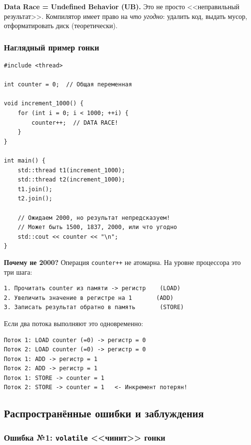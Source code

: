 \documentclass[a4paper,12pt]{article}
\begin{document}
\textbf{Data Race = Undefined Behavior (UB).} Это не просто <<неправильный результат>>.
Компилятор имеет право на \textit{что угодно}: удалить код, выдать мусор,
отформатировать диск (теоретически).

\subsubsection{Наглядный пример гонки}

\begin{lstlisting}
#include <thread>

int counter = 0;  // Общая переменная

void increment_1000() {
    for (int i = 0; i < 1000; ++i) {
        counter++;  // DATA RACE!
    }
}

int main() {
    std::thread t1(increment_1000);
    std::thread t2(increment_1000);
    t1.join();
    t2.join();

    // Ожидаем 2000, но результат непредсказуем!
    // Может быть 1500, 1837, 2000, или что угодно
    std::cout << counter << "\n";
}
\end{lstlisting}

\textbf{Почему не 2000?} Операция \texttt{counter++} не атомарна.
На уровне процессора это три шага:

\begin{lstlisting}[numbers=none]
1. Прочитать counter из памяти -> регистр    (LOAD)
2. Увеличить значение в регистре на 1       (ADD)
3. Записать результат обратно в память       (STORE)
\end{lstlisting}

Если два потока выполняют это одновременно:

\begin{lstlisting}[numbers=none]
Поток 1: LOAD counter (=0) -> регистр = 0
Поток 2: LOAD counter (=0) -> регистр = 0
Поток 1: ADD -> регистр = 1
Поток 2: ADD -> регистр = 1
Поток 1: STORE -> counter = 1
Поток 2: STORE -> counter = 1   <- Инкремент потерян!
\end{lstlisting}

\subsection{Распространённые ошибки и заблуждения}

\subsubsection{Ошибка №1: \texttt{volatile} <<чинит>> гонки}
\end{document}
